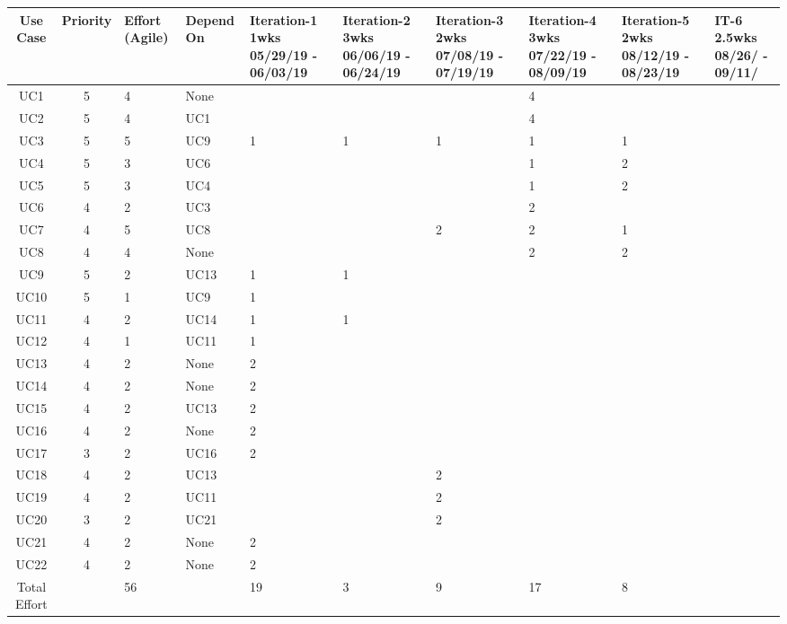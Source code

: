 \documentclass[11pt]{article}
\begin{document}
\begin{center}
	\hspace*{-1.8cm}\begin{tabular}{|c|c|p{2.4cm}|p{1.2cm}|p{1.8cm}|p{1.8cm}|p{1.8cm}|p{1.8cm}|p{1.8cm}|p{1cm}|}
	\hline
	Use Case & Priority & Effort (Agile) & Depend On & Iteration-1  1wks 05/29/19 - 06/03/19 & Iteration-2 3wks 06/06/19 - 06/24/19 & Iteration-3 2wks 07/08/19 - 07/19/19 & Iteration-4 3wks 07/22/19 - 08/09/19 & Iteration-5 2wks  08/12/19 - 08/23/19 & IT-6 2.5wks 08/26/ - 09/11/\\
	\hline
	UC1 & 5 & 4 & None & & & & 4 & & \\
	\hline
	UC2 & 5 & 4 & UC1 & & & & 4 & & \\
	\hline
	UC3 & 5 & 5 & UC9 & 1 & 1 & 1 & 1 & 1 & \\
	\hline
	UC4 & 5 & 3 & UC6 & & & & 1 & 2 & \\
	\hline
	UC5 & 5 & 3 & UC4 & & & & 1 & 2 & \\
	\hline
	UC6 & 4 & 2 & UC3 & & & & 2 & & \\
	\hline
	UC7 & 4 & 5 & UC8 & & & 2 & 2 & 1 & \\
	\hline
	UC8 & 4 & 4 & None & & & & 2 & 2 & \\
	\hline
	UC9 & 5 & 2 & UC13 & 1 & 1 & & & & \\
	\hline
	UC10 & 5 & 1 & UC9 & 1 & & & & & \\
	\hline
	UC11 & 4 & 2 & UC14 & 1 & 1 & & & & \\
	\hline
	UC12 & 4 & 1 & UC11 & 1 & & & & & \\
	\hline
	UC13 & 4 & 2 & None & 2 & & & & & \\
	\hline
	UC14 & 4 & 2 & None & 2 & & & & & \\
	\hline
	UC15 & 4 & 2 & UC13 & 2 & & &  &  & \\
	\hline
	UC16 & 4 & 2 & None & 2 & & &  & & \\
	\hline
	UC17 & 3 & 2 & UC16 & 2 & & & & & \\
	\hline
	UC18 & 4 & 2 & UC13 & & & 2 & & & \\
	\hline
	UC19 & 4 & 2 & UC11 & & & 2 & & & \\
	\hline
	UC20 & 3 & 2 & UC21 & & & 2 & & & \\
	\hline
	UC21 & 4 & 2 & None & 2 & &  & & & \\
	\hline
	UC22 & 4 & 2 & None & 2 & & & & & \\
	\hline
	Total Effort &  & 56 & & 19 & 3 & 9 & 17 & 8 & \\
	\hline
	\end{tabular}
\end{center}
\end{document}
